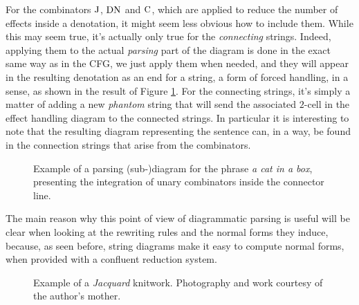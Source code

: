 \medskip

For the combinators $\text{J}$, $\text{DN}$ and $\text{C}$, which are applied to
reduce the number of effects inside a denotation, it might seem less obvious
how to include them.
While this may seem true, it's actually only true for the \emph{connecting}
strings.
Indeed, applying them to the actual \emph{parsing} part of the diagram is done
in the exact same way as in the CFG, we just apply them when needed, and they
will appear in the resulting denotation as an end for a string, a form of
forced handling, in a sense, as shown in the result of Figure
\ref{fig:parsing-diagram2}.
For the connecting strings, it's simply a matter of adding a new \emph{phantom}
string that will send the associated $2$-cell in the effect handling diagram to
the connected strings.
In particular it is interesting to note that the resulting diagram representing
the sentence can, in a way, be found in the connection strings that arise from
the combinators.

\begin{figure}
	\centering
	\caption{Example of a parsing (sub-)diagram for the phrase
		\emph{a cat in a box}, presenting the integration of unary combinators
		inside the connector line.}
	\label{fig:parsing-diagram2}
\end{figure}

The main reason why this point of view of diagrammatic parsing is useful
will be clear when looking at the rewriting rules and the normal forms they
induce, because, as seen before, string diagrams make it easy to compute
normal forms, when provided with a confluent reduction system.

\begin{figure}
	\centering
	\caption{Example of a \emph{Jacquard} knitwork. Photography and work courtesy
		of the author's mother.}
	\label{fig:knitting-example}
\end{figure}

